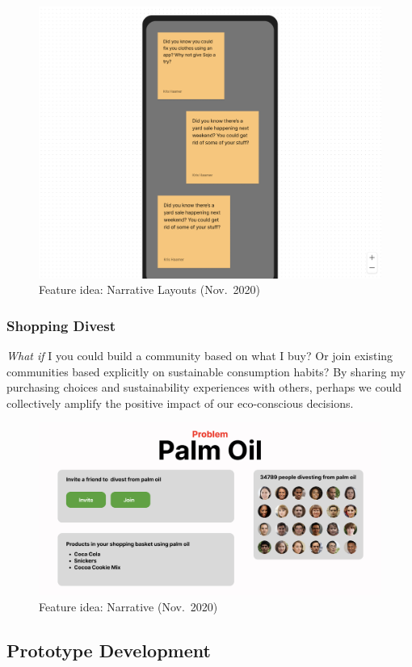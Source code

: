 \documentclass[
  12pt,
  letterpaper,
  DIV=11,
  numbers=noendperiod]{scrartcl}
\begin{document}
\begin{figure}[H]

{\centering \includegraphics[width=0.5\linewidth,height=\textheight,keepaspectratio]{./images/prototypes/narrative.png}

}

\caption{Feature idea: Narrative Layouts (Nov.~2020)}

\end{figure}%

\subsubsection{Shopping Divest}\label{shopping-divest}

\emph{What if} I you could build a community based on what I buy? Or
join existing communities based explicitly on sustainable consumption
habits? By sharing my purchasing choices and sustainability experiences
with others, perhaps we could collectively amplify the positive impact
of our eco-conscious decisions.

\begin{figure}[H]

{\centering \includegraphics[width=0.5\linewidth,height=\textheight,keepaspectratio]{./images/prototypes/shopping-divest.png}

}

\caption{Feature idea: Narrative (Nov.~2020)}

\end{figure}%

\newpage

\subsection{Prototype Development}\label{prototype-development}
\end{document}
